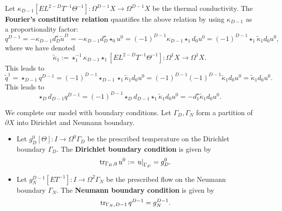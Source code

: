 \begin{discussion}
\begin{itemize}
      Let
      $\kappa_{D - 1} [E L^{2 - D} T^{-1} \Theta^{-1}]
      \colon \Omega^{D - 1} X \to \Omega^{D - 1} X$
      be the thermal conductivity.
      The \textbf{Fourier's constitutive relation}
      quantifies the above relation by using $\kappa_{D - 1}$
      as a proportionality factor:
      \begin{equation}
        q^{D - 1}
        = - \kappa_{D - 1} d_D^\star \tilde{u}^D
        = - \kappa_{D - 1} d_D^\star \star_0 u^0
        = (-1)^{D - 1} \kappa_{D - 1} \star_1 d_0 u^0
        = (-1)^{D - 1} \star_1 \tilde{\kappa}_1 d_0 u^0,
      \end{equation}
      where we have denoted
      \begin{equation}
        \tilde{\kappa}_1
        :=\star_1^{-1} \kappa_{D - 1} \star_1 [E L^{2 - D} T^{-1} \Theta^{-1}]
        \colon \Omega^1 X \to \Omega^1 X.
      \end{equation}
      This leads to
      \begin{equation}
        \tilde{q}^1
        = \star_{D - 1} q^{D - 1}
        = (-1)^{D - 1} \star_{D - 1} \star_1 \tilde{\kappa}_1 d_0 u^0
        = (-1)^{D - 1} (-1)^{D - 1} \tilde{\kappa}_1 d_0 u^0
        = \tilde{\kappa}_1 d_0 u^0.
      \end{equation}
      This leads to
      \begin{equation}
        \star_D d_{D - 1} q^{D - 1}
        = (-1)^{D - 1} \star_D d_{D - 1} \star_1 \tilde{\kappa}_1 d_0 u^0
        = - d^\star_1 \tilde{\kappa}_1 d_0 u^0.
      \end{equation}
  \end{itemize}
  We complete our model with boundary conditions.
  Let $\Gamma_D, \Gamma_N$ form a partition of $\partial X$
  into Dirichlet and Neumann boundary.
  \begin{itemize}
    \item
      Let $g_D^0 [\Theta] \colon I \to \Omega^0 \Gamma_D$
      be the prescribed temperature on the Dirichlet boundary $\Gamma_D$.
      The \textbf{Dirichlet boundary condition} is given by
      \begin{equation}
        \mathop{\rm tr}\nolimits_{\Gamma_D, 0} u^0 := \left. u \right|_{\Gamma_D} = g_D^0.
      \end{equation}
    \item
      Let $g_N^{D - 1} [E T^{-1}] \colon I \to \Omega^2 \Gamma_N$
      be the prescribed flow on the Neumann boundary $\Gamma_N$.
      The \textbf{Neumann boundary condition} is given by
      \begin{equation}
        \mathop{\rm tr}\nolimits_{\Gamma_N, D - 1} q^{D - 1} = g_N^{D - 1}.
      \end{equation}
  \end{itemize}
\end{discussion}
